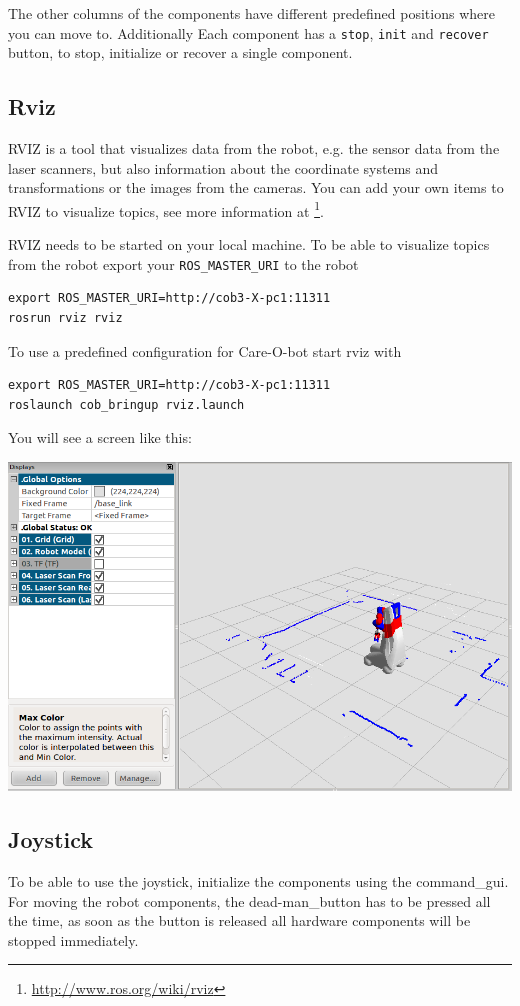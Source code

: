 The other columns of the components have different predefined positions where you can move to. Additionally Each component has a \texttt{stop}, \texttt{init} and \texttt{recover} button, to stop, initialize or recover a single component.

\subsection{Rviz}\label{subsec:rviz}
RVIZ is a tool that visualizes data from the robot, e.g. the sensor data from the laser scanners, but also information about the coordinate systems and transformations or the images from the cameras. You can add your own items to RVIZ to visualize topics, see more information at \footnote{\url{http://www.ros.org/wiki/rviz}}.

RVIZ needs to be started on your local machine. To be able to visualize topics from the robot export your \texttt{ROS\_MASTER\_URI} to the robot
\begin{lstlisting}
export ROS_MASTER_URI=http://cob3-X-pc1:11311
rosrun rviz rviz
\end{lstlisting}

To use a predefined configuration for Care-O-bot start rviz with
\begin{lstlisting}
export ROS_MASTER_URI=http://cob3-X-pc1:11311
roslaunch cob_bringup rviz.launch
\end{lstlisting}

You will see a screen like this:
\begin {center}
\includegraphics[width=1\textwidth]{images/rviz.png}
\end{center}

\subsection{Joystick}\label{subsec:joystick}
To be able to use the joystick, initialize the components using the command\_gui. For moving the robot components, the dead-man\_button has to be pressed all the time, as soon as the button is released all hardware components will be stopped immediately. 

